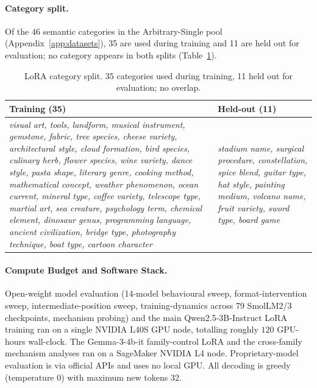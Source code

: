 \documentclass[11pt]{article}
\begin{document}
\paragraph{Category split.}
Of the 46 semantic categories in the Arbitrary-Single pool
(Appendix~\ref{app:datasets}), 35 are used during training and 11
are held out for evaluation; no category appears in both splits
(Table~\ref{tab:lora_categories}).

\begin{table}[!htbp]
\centering
\footnotesize
\begin{tabular}{p{} p{}}
\toprule
\textbf{Training (35)} & \textbf{Held-out (11)} \\
\midrule
\emph{visual art, tools, landform, musical instrument, gemstone,
fabric, tree species, cheese variety, architectural style, cloud
formation, bird species, culinary herb, flower species, wine
variety, dance style, pasta shape, literary genre, cooking method,
mathematical concept, weather phenomenon, ocean current, mineral
type, coffee variety, telescope type, martial art, sea creature,
psychology term, chemical element, dinosaur genus, programming
language, ancient civilization, bridge type, photography technique,
boat type, cartoon character} &
\emph{stadium name, surgical procedure, constellation, spice blend,
guitar type, hat style, painting medium, volcano name, fruit variety,
sword type, board game} \\
\bottomrule
\end{tabular}
\caption{LoRA category split. 35 categories used during training, 11
held out for evaluation; no overlap.}
\label{tab:lora_categories}
\end{table}

\paragraph{Compute Budget and Software Stack.}
Open-weight model evaluation (14-model behavioural sweep,
format-intervention sweep, intermediate-position sweep,
training-dynamics across 79 SmolLM2/3 checkpoints, mechanism
probing) and the main Qwen2.5-3B-Instruct LoRA training ran on a
single NVIDIA L40S GPU node, totalling roughly $120$ GPU-hours
wall-clock. The Gemma-3-4b-it family-control LoRA and the
cross-family mechanism analyses ran on a SageMaker NVIDIA L4 node.
Proprietary-model evaluation is via official APIs and uses no local
GPU. All decoding is greedy (temperature 0) with maximum new
tokens 32.
\end{document}
